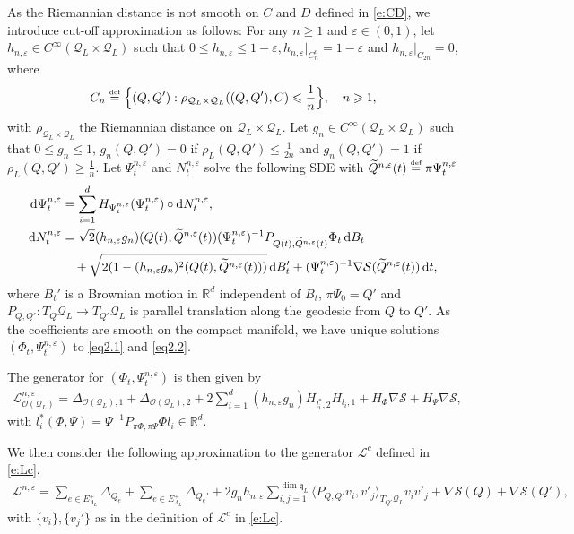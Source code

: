 \documentclass[11pt,UTF-8,reqno]{amsart}
\numberwithin{equation}{section}
\def\eps{\varepsilon}
\def\<{{\langle}}
\def\>{{\rangle}}
\def\dif{{\mathord{{\rm d}}}}
\newcommand{\eqdef}{\stackrel{\mbox{\tiny def}}{=}}
\def\cL{{\mathcal L}}
\def\cQ{{\mathcal Q}}
\def\cS{{\mathcal S}}
\def\mR{{\mathbb R}}
\def\sO{{\mathscr O}}
\def\geq{\geqslant}
\def\leq{\leqslant}
\def\q{\mathfrak{q}}
\def\eps{\varepsilon}
\def\<{{\langle}}
\def\>{{\rangle}}
\def\dif{{\mathord{{\rm d}}}}
\def\geq{\geqslant}
\def\leq{\leqslant}
\def\<{\langle} \def\>{\rangle}
\begin{document}
As the Riemannian distance is not smooth on $C$ and $D$  defined in \eqref{e:CD}, we introduce cut-off approximation as follows:
For any $n\geq 1$ and $\eps\in (0,1)$, let $h_{n,\eps}\in C^\infty(\cQ_L\times \cQ_L)$ such that $0\leq h_{n,\eps}\leq {1-\eps}, h_{n,\eps}|_{C_n^c}={1-\eps}$ and $h_{n,\eps}|_{C_{2n}}=0$, where
\begin{align*}
	C_n\eqdef \Big\{(Q,Q'):\rho_{\cQ_L\times \cQ_L}((Q,Q'),C)\leq \frac1n\Big\},\quad n\geq 1,
\end{align*}
with $\rho_{\cQ_L\times \cQ_L}$ the Riemannian distance on $\cQ_L\times \cQ_L$. Let $g_n\in C^\infty(\cQ_L\times \cQ_L)$ such that $0\leq g_n\leq 1$, $g_n(Q,Q')=0$ if $\rho_L(Q,Q')\leq \frac1{2n}$ and $g_n(Q,Q')=1$ if $\rho_L(Q,Q')\geq \frac1{n}$.
Let $\Psi_t^{n,\eps}$ and $N_t^{n,\eps}$ solve the following SDE
with $\widetilde{Q}^{n,\eps}(t) \eqdef \pi \Psi_t^{n,\eps}$
\begin{equation}\label{eq2.2}
	\aligned
	\dif \Psi_t^{n,\eps} &=\sum_{i=1}^d H_{\Psi_t^{n,\eps}}(\Psi_t^{n,\eps})\circ \dif N_t^{n,\eps},\\
	\dif N_t^{n,\eps}&= \sqrt2(h_{n,\eps}g_n)(Q(t),\widetilde{Q}^{n,\eps}(t))(\Psi_t^{n,\eps})^{-1}
	P_{Q(t),\widetilde{Q}^{n,\eps}(t)}\Phi_t \, \dif B_t
	\\
	&\quad+\sqrt{2(1-(h_{n,\eps}g_n)^2(Q(t),\widetilde{Q}^{n,\eps}(t)))} \, \dif B_t'
	+(\Psi_t^{n,\eps})^{-1}\nabla \cS(\widetilde{Q}^{n,\eps}(t)) \, \dif t,
	\endaligned
\end{equation}
where $B_t'$ is a Brownian motion in $\mR^d$ independent of $B_t$,  $\pi \Psi_0=Q'$
 and $P_{Q,Q'}:T_Q\cQ_L\to T_{Q'}\cQ_L$ is parallel translation along the geodesic from $Q$ to $Q'$.
 As the coefficients are smooth on the compact manifold, we have unique solutions $(\Phi_t,\Psi_t^{n,\eps})$ to \eqref{eq2.1} and \eqref{eq2.2}.


The generator for  $(\Phi_t,\Psi_t^{n,\eps})$ is then given by
\begin{align*}
	\cL^{n,\eps}_{\sO(\cQ_L)}= \Delta_{\sO(\cQ_L),1}+\Delta_{\sO(\cQ_L),2}+2\sum_{i=1}^d(h_{n,\eps}g_n)H_{l_i^*,2}H_{l_i,1}+H_\Phi \nabla \cS+H_\Psi \nabla \cS,
\end{align*}
with $l_i^*(\Phi,\Psi)=\Psi^{-1}P_{\pi\Phi,\pi\Psi}\Phi l_i\in \mR^d$.

We then consider the following approximation to the generator $\cL^c$  defined in \eqref{e:Lc}.
\begin{align*}
	\cL^{n,\eps}=\sum_{e\in E_{\Lambda_{L}}^+}\Delta_{Q_e}+\sum_{e\in E_{\Lambda_{L}}^+}\Delta_{Q_e'}+2g_nh_{n,\eps}\sum_{i,j=1}^{\dim \q_L}\<P_{Q,Q'}v_i,v'_j\>_{T_{Q'}\cQ_L}v_iv'_j+\nabla\cS(Q)+ \nabla\cS(Q'),
\end{align*}
with $\{v_i\}, \{v_j'\}$ as in the definition of $\cL^c$ in  \eqref{e:Lc}.
\end{document}
